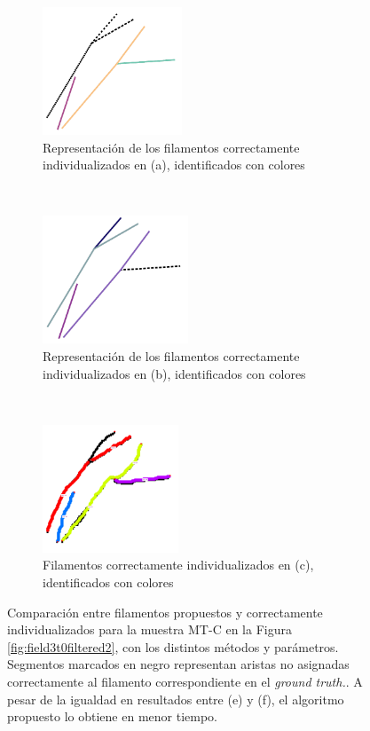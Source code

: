 \begin{figure}[h!]
    \begin{subfigure}[t]{0.3\textwidth}
        \centering
        \includegraphics[height=1.5in]{resultImages/field3-t0-2cellBcrop-filtered-2-DeFiNeExactMatch-30.png}
        \caption{Representaci\'on de los filamentos correctamente individualizados en (a), identificados con colores}
        \label{fig:field3t0filtered2Results-d}
    \end{subfigure}%
    ~ 
    \begin{subfigure}[t]{0.3\textwidth}
        \centering
        \includegraphics[height=1.5in]{resultImages/field3-t0-2cellBcrop-filtered-2-DeFiNeExactMatch-60.png}
        \caption{Representaci\'on de los filamentos correctamente individualizados en (b), identificados con colores}
        \label{fig:field3t0filtered2Results-e}
    \end{subfigure}
    ~ 
    \begin{subfigure}[t]{0.3\textwidth}
        \centering
        \includegraphics[height=1.5in]{resultImages/field3-t0-2cellBcrop-filtered-2-phil-s1271-v05-exactMatch-antLabeled.png}
        \caption{Filamentos correctamente individualizados en (c), identificados con colores}
        \label{fig:field3t0filtered2Results-f}
    \end{subfigure}
    
    \caption[Comparaci\'on entre filamentos propuestos y correctamente individualizados para la muestra MT-C en la Figura \ref{fig:field3t0filtered2}, con los distintos m\'etodos y par\'ametros.]{Comparaci\'on entre filamentos propuestos y correctamente individualizados para la muestra MT-C en la Figura \ref{fig:field3t0filtered2}, con los distintos m\'etodos y par\'ametros. Segmentos marcados en negro representan aristas no asignadas correctamente al filamento correspondiente en el {\it ground truth.}. A pesar de la igualdad en resultados entre (e) y (f), el algoritmo propuesto lo obtiene en menor tiempo.}
    \label{fig:field3t0filtered2Results}
\end{figure}

